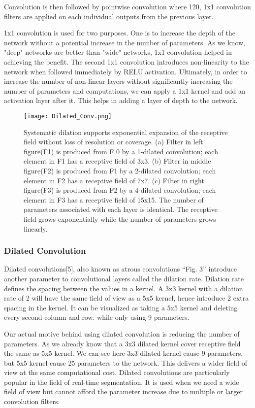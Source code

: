 \documentclass[conference]{IEEEtran}
\begin{document}
Convolution is then followed by pointwise convolution where 120, 1x1 convolution filters are applied on each individual outputs from the previous layer. 

1x1 convolution is used for two purposes. One is to increase the depth of the network without a potential increase in the number of parameters. As we know, "deep" networks are better than "wide" networks, 1x1 convolution helped in achieving the benefit. The second 1x1 convolution introduces non-linearity to the network when followed immediately by RELU activation. Ultimately, in order to increase the number of non-linear layers without significantly increasing the number of parameters and computations, we can apply a 1x1 kernel and add an activation layer after it. This helps in adding a layer of depth to the network.


\begin{figure*}[htbp]
\centerline{\texttt{[image: Dilated\_Conv.png]}}
\caption{Systematic dilation supports exponential expansion of the receptive field without loss of resolution or coverage. (a) Filter in left figure(F1) is produced from F 0 by a 1-dilated convolution; each element in F1 has a receptive field of 3x3. (b) Filter in middle figure(F2) is produced from F1 by a 2-dilated convolution; each element in F2 has a receptive field of 7x7. (c) Filter in right figure(F3) is produced from F2 by a 4-dilated convolution; each element in F3 has a receptive field of 15x15. The number of parameters associated with each layer is identical. The receptive field grows exponentially while the number of parameters grows linearly.}
\label{fig}
\end{figure*}

\subsubsection{Dilated Convolution}

Dilated convolutions[5], also known as atrous convolutions “Fig. 3” introduce another parameter to convolutional layers called the dilation rate. Dilation rate defines the spacing between the values in a kernel. A 3x3 kernel with a dilation rate of 2 will have the same field of view as a 5x5 kernel, hence introduce 2 extra spacing in the kernel. It can be visualized as taking a 5x5 kernel and deleting every second column and row.  while only using 9 parameters.

Our actual motive behind using dilated convolution is reducing the number of parameters. As we already know that a 3x3 dilated kernel cover receptive field the same as 5x5 kernel. We can see here 3x3 dilated kernel cause 9 parameters, but 5x5 kernel cause 25 parameters to the network. This delivers a wider field of view at the same computational cost. Dilated convolutions are particularly popular in the field of real-time segmentation. It is used when we need a wide field of view but cannot afford the parameter increase due to multiple or larger convolution filters. 
\end{document}

